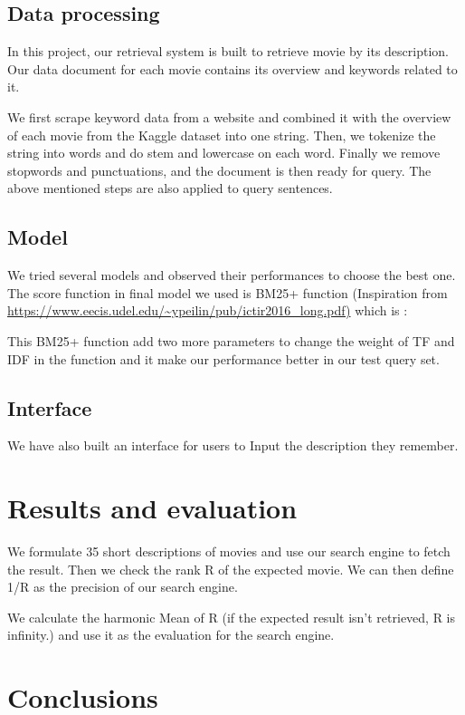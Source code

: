 \documentclass[letterpaper,10pt]{article}
\begin{document}
\begin{multicols}{2}
    \subsection{Data processing}

    In this project, our retrieval system is built to retrieve movie by its description.
    Our data document for each movie contains its overview and keywords related to it.

    We first scrape keyword data from a website and combined it with the overview of each movie from the Kaggle dataset into one string. Then,  we tokenize the string into words and do stem and lowercase on each word. Finally we remove stopwords and punctuations, and  the document is then ready for query. The above mentioned steps are also applied to query sentences.

    \subsection{Model}

    We tried several models and observed their performances to choose the best one. The score function in final model we used is BM25+ function (Inspiration from \url{https://www.eecis.udel.edu/~ypeilin/pub/ictir2016_long.pdf)} which is :


    This BM25+ function add two more parameters to change the weight of TF and IDF in the function and it make our performance better in our test query set.

    \subsection{Interface }

    We have also built an interface for users to Input the description they remember.

    \section{Results and evaluation}

    We formulate 35 short descriptions of movies and use our search engine to fetch the result. Then we check the rank R of the expected movie. We can then define 1/R as the precision of our search engine.

    We calculate the harmonic Mean of R (if the expected result isn’t retrieved, R is infinity.) and use it as the evaluation for the search engine.

    \section{Conclusions}


\end{multicols}
\end{document}
